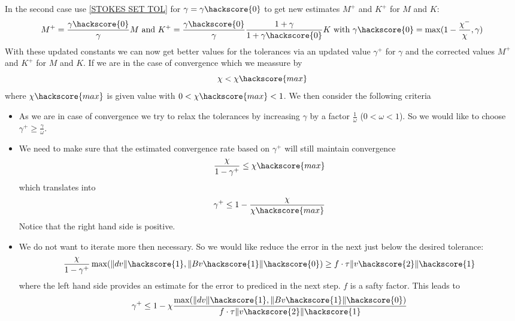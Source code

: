 In the second case use \ref{STOKES SET TOL} for $\gamma=\gamma\hackscore{0}$ to get new estimates $M^{+}$ and $K^{+}$
for $M$ and $K$:
\begin{equation} \label{TOKES CONST UPDATE}
M^{+} = 
\frac{\gamma\hackscore{0}}{\gamma} M
\mbox{ and } K^{+} = 
\frac{\gamma\hackscore{0}}{\gamma}
\frac{1+\gamma}{1+\gamma\hackscore{0}}
K 
\mbox{ with } \gamma\hackscore{0}=\max(1-\frac{\chi^{-}}{ \chi},\gamma)
\end{equation}
With these updated constants we can now get better values for the tolerances via an updated value $\gamma^{+}$ for $\gamma$ and the corrected values $M^{+}$ and $K^{+}$ for $M$ and $K$. If we are in the case of convergence which we 
meassure by 
\begin{equation}
\chi < \chi\hackscore{max}
\end{equation}
where $\chi\hackscore{max}$ is given value with $0<\chi\hackscore{max}<1$. We then consider the following 
criteria
\begin{itemize}
 \item As we are in case of convergence we try to relax the tolerances by increasing $\gamma$ by a factor $\frac{1}{\omega}$ ($0<\omega<1$). So we would like to choose 
$\gamma^{+} \ge \frac{\gamma}{\omega}$.
\item We need to make sure that the estimated convergence rate based on $\gamma^{+}$ will still maintain convergence 
\begin{equation}
\frac{\chi}{1-\gamma^{+}} \le \chi\hackscore{max} 
\end{equation}
which translates into 
\begin{equation}
\gamma^{+} \le 1 - \frac{\chi}{\chi\hackscore{max}} 
\end{equation}
Notice that the right hand side is positive.
\item We do not want to iterate more then necessary. So we would like reduce the error in the next just below the 
desired tolerance:
\begin{equation}
\frac{\chi}{1-\gamma^{+}}\max(\|dv\|\hackscore{1}, \|Bv\hackscore{1}\|\hackscore{0}) \ge f \cdot \tau \|v\hackscore{2}\|\hackscore{1}
\end{equation}
where the left hand side provides an estimate for the error to prediced in the next step. $f$ is a 
safty factor. This leads to
\begin{equation}
\gamma^{+} \le
1 - 
\chi \frac{\max(\|dv\|\hackscore{1}, \|Bv\hackscore{1}\|\hackscore{0})} { f \cdot \tau \|v\hackscore{2}\|\hackscore{1}}
\end{equation}
\end{itemize}
